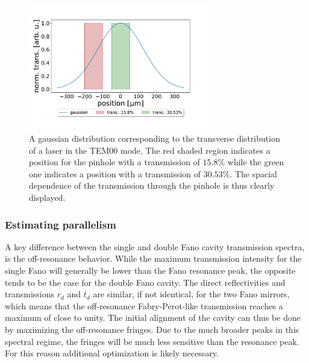 \begin{figure}[h!]
    \centering
    \includegraphics[width=0.7\textwidth]{figures/pinhole_position_on_gaussian.pdf}
    \caption{A gaussian distribution corresponding to the transverse distribution of a laser in the TEM00 mode. The red shaded region indicates a position for the pinhole with a transmission of $15.8\%$ while the green one indicates a position with a transmission of $30.53\%$. The spacial dependence of the transmission through the pinhole is thus clearly displayed.}
    \label{fig:pinhole_position_on_gaussian}
\end{figure}

\subsubsection{Estimating parallelism}\label{sec:parallelism}

A key difference between the single and double Fano cavity transmission spectra, is the off-resonance behavior. While the maximum transmission intensity for the single Fano will generally be lower than the Fano resonance peak, the opposite tends to be the case for the double Fano cavity. The direct reflectivities and transmissions $r_d$ and $t_d$ are similar, if not identical, for the two Fano mirrors, which means that the off-resonance Fabry-Perot-like transmission reaches a maximum of close to unity. The initial alignment of the cavity can thus be done by maximizing the off-resonance fringes. Due to the much broader peaks in this spectral regime, the fringes will be much less sensitive than the resonance peak. For this reason additional optimization is likely necessary. 


